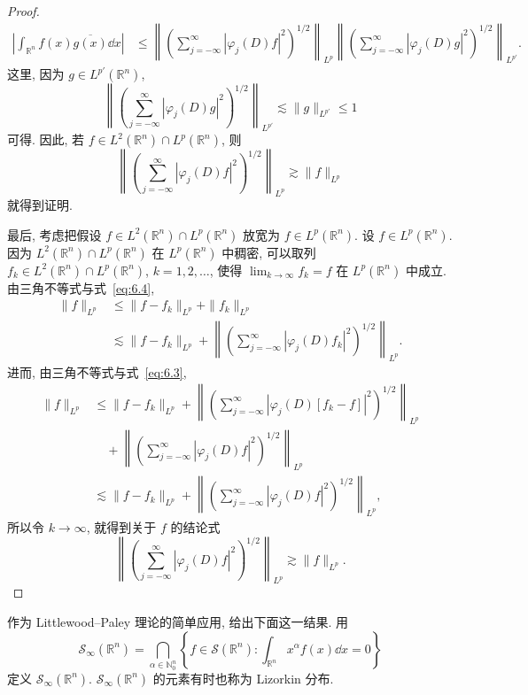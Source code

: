 \begin{proof}
\[
\begin{aligned}
\left|\int_{\mathbb{R}^{n}}f(x)\overline{g(x)}\dd x\right| &\leq \left\|\left(\sum_{j=-\infty}^{\infty}|\varphi_{j}(D)f|^{2}\right)^{1/2}\right\|_{L^{p}}\left\|\left(\sum_{j=-\infty}^{\infty}|\varphi_{j}(D)g|^{2}\right)^{1/2}\right\|_{L^{p'}}.
\end{aligned}
\]
这里, 因为 $g \in L^{p'}(\mathbb{R}^{n})$,
\[
\left\|\left(\sum_{j=-\infty}^{\infty}|\varphi_{j}(D)g|^{2}\right)^{1/2}\right\|_{L^{p'}} \lesssim \|g\|_{L^{p'}} \leq 1
\]
可得. 因此, 若 $f \in L^{2}(\mathbb{R}^{n}) \cap L^{p}(\mathbb{R}^{n})$, 则
\begin{equation}\tag{6.4}
\left\|\left(\sum_{j=-\infty}^{\infty}|\varphi_{j}(D)f|^{2}\right)^{1/2}\right\|_{L^{p}} \gtrsim \|f\|_{L^{p}}
\label{eq:6.4}
\end{equation}
就得到证明.

最后, 考虑把假设 $f \in L^{2}(\mathbb{R}^{n}) \cap L^{p}(\mathbb{R}^{n})$ 放宽为 $f \in L^{p}(\mathbb{R}^{n})$. 设 $f \in L^{p}(\mathbb{R}^{n})$. 因为 $L^{2}(\mathbb{R}^{n}) \cap L^{p}(\mathbb{R}^{n})$ 在 $L^{p}(\mathbb{R}^{n})$ 中稠密, 可以取列 $f_{k} \in L^{2}(\mathbb{R}^{n}) \cap L^{p}(\mathbb{R}^{n})$, $k = 1, 2, \ldots$, 使得 $\lim_{k \to \infty}f_{k} = f$ 在 $L^{p}(\mathbb{R}^{n})$ 中成立. 由三角不等式与式~\eqref{eq:6.4},
\[
\begin{aligned}
\|f\|_{L^{p}} &\leq \|f - f_{k}\|_{L^{p}} + \|f_{k}\|_{L^{p}} \\
&\lesssim \|f - f_{k}\|_{L^{p}} + \left\|\left(\sum_{j=-\infty}^{\infty}|\varphi_{j}(D)f_{k}|^{2}\right)^{1/2}\right\|_{L^{p}}.
\end{aligned}
\]
进而, 由三角不等式与式~\eqref{eq:6.3},
\[
\begin{aligned}
\|f\|_{L^{p}} &\leq \|f - f_{k}\|_{L^{p}} + \left\|\left(\sum_{j=-\infty}^{\infty}|\varphi_{j}(D)[f_{k} - f]|^{2}\right)^{1/2}\right\|_{L^{p}} \\
&\quad + \left\|\left(\sum_{j=-\infty}^{\infty}|\varphi_{j}(D)f|^{2}\right)^{1/2}\right\|_{L^{p}} \\
&\lesssim \|f - f_{k}\|_{L^{p}} + \left\|\left(\sum_{j=-\infty}^{\infty}|\varphi_{j}(D)f|^{2}\right)^{1/2}\right\|_{L^{p}},
\end{aligned}
\]
所以令 $k \to \infty$, 就得到关于 $f$ 的结论式
\[
\left\|\left(\sum_{j=-\infty}^{\infty}|\varphi_{j}(D)f|^{2}\right)^{1/2}\right\|_{L^{p}} \gtrsim \|f\|_{L^{p}}.
\]
\end{proof}

作为 Littlewood--Paley 理论的简单应用, 给出下面这一结果. 用
\[
\mathcal{S}_{\infty}(\mathbb{R}^{n}) = \bigcap_{\alpha \in \mathbb{N}_{0}^{n}}\left\{f \in \mathcal{S}(\mathbb{R}^{n}): \int_{\mathbb{R}^{n}}x^{\alpha}f(x)\dd x = 0\right\}
\]
定义 $\mathcal{S}_{\infty}(\mathbb{R}^{n})$. $\mathcal{S}_{\infty}(\mathbb{R}^{n})$ 的元素有时也称为 Lizorkin 分布.

